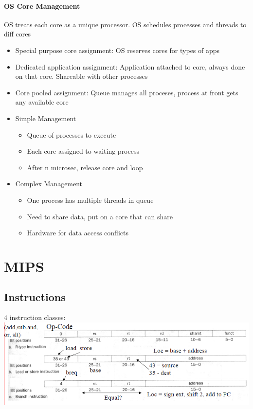\documentclass[12 pt]{article}
\begin{document}
\paragraph{OS Core Management}
OS treats each core as a unique processor. OS schedules processes and threads to diff cores
\begin{itemize}
\item Special purpose core assignment: OS reserves cores for types of apps
\item Dedicated application assignment: Application attached to core, always done on that core. Shareable with other processes
\item Core pooled assignment: Queue manages all proceses, process at front gets any available core
\item Simple Management
\begin{itemize}
\item Queue of processes to execute
\item Each core assigned to waiting process
\item After n microsec, release core and loop
\end{itemize}
\item Complex Management
\begin{itemize}
\item One process has multiple threads in queue
\item Need to share data, put on a core that can share
\item Hardware for data access conflicts
\end{itemize}
\end{itemize}
	\section{MIPS}
	\subsection{Instructions}
	4 instruction classes:
	\\ \includegraphics[scale=0.7]{4ins}
\end{document}
